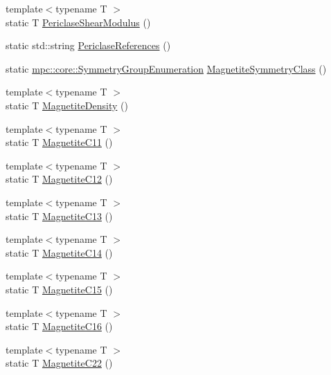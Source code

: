 \begin{DoxyCompactItemize}
\item 
{\footnotesize template$<$typename T $>$ }\\static T \mbox{\hyperlink{namespacempc_1_1data_a37b7b1ff47bd059579e86f9d992d2d3d}{Periclase\+Shear\+Modulus}} ()
\item 
static std\+::string \mbox{\hyperlink{namespacempc_1_1data_a6f4cfa59bcde68d97eda95e810e984ca}{Periclase\+References}} ()
\item 
static \mbox{\hyperlink{namespacempc_1_1core_a9d979684062547055a0ef5c13077bad8}{mpc\+::core\+::\+Symmetry\+Group\+Enumeration}} \mbox{\hyperlink{namespacempc_1_1data_afa0245caf4809ff285c3e71704b31a22}{Magnetite\+Symmetry\+Class}} ()
\item 
{\footnotesize template$<$typename T $>$ }\\static T \mbox{\hyperlink{namespacempc_1_1data_a05bbeeb11aed90d874cb320243548b71}{Magnetite\+Density}} ()
\item 
{\footnotesize template$<$typename T $>$ }\\static T \mbox{\hyperlink{namespacempc_1_1data_a752554da3cc5c37240682acd2fa74cbc}{Magnetite\+C11}} ()
\item 
{\footnotesize template$<$typename T $>$ }\\static T \mbox{\hyperlink{namespacempc_1_1data_ad586835141915eaaf8b4627e999d065b}{Magnetite\+C12}} ()
\item 
{\footnotesize template$<$typename T $>$ }\\static T \mbox{\hyperlink{namespacempc_1_1data_a2a3aa8d2256b3f5e09e3de5b143b6096}{Magnetite\+C13}} ()
\item 
{\footnotesize template$<$typename T $>$ }\\static T \mbox{\hyperlink{namespacempc_1_1data_afab9f24026421a9d1d4da2d43df15010}{Magnetite\+C14}} ()
\item 
{\footnotesize template$<$typename T $>$ }\\static T \mbox{\hyperlink{namespacempc_1_1data_af3b0caf8e5d242078154d5f3bb7607de}{Magnetite\+C15}} ()
\item 
{\footnotesize template$<$typename T $>$ }\\static T \mbox{\hyperlink{namespacempc_1_1data_aaad0bdfaea022f679ab0cd3856920bb4}{Magnetite\+C16}} ()
\item 
{\footnotesize template$<$typename T $>$ }\\static T \mbox{\hyperlink{namespacempc_1_1data_a1c6a2798f409cbc3e05328944425c280}{Magnetite\+C22}} ()
\item 

\end{DoxyCompactItemize}
